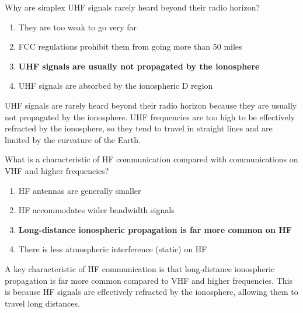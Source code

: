 \begin{tcolorbox}[colback=gray!10!white,colframe=black!75!black,title={T3C01}]
    Why are simplex UHF signals rarely heard beyond their radio horizon?
    \begin{enumerate}[label=\Alph*),noitemsep]
        \item They are too weak to go very far
        \item FCC regulations prohibit them from going more than 50 miles
        \item \textbf{UHF signals are usually not propagated by the ionosphere}
        \item UHF signals are absorbed by the ionospheric D region
    \end{enumerate}
\end{tcolorbox}
UHF signals are rarely heard beyond their radio horizon because they are usually not propagated by the ionosphere. UHF frequencies are too high to be effectively refracted by the ionosphere, so they tend to travel in straight lines and are limited by the curvature of the Earth.

\begin{tcolorbox}[colback=gray!10!white,colframe=black!75!black,title={T3C02}]
    What is a characteristic of HF communication compared with communications on VHF and higher frequencies?
    \begin{enumerate}[label=\Alph*),noitemsep]
        \item HF antennas are generally smaller
        \item HF accommodates wider bandwidth signals
        \item \textbf{Long-distance ionospheric propagation is far more common on HF}
        \item There is less atmospheric interference (static) on HF
    \end{enumerate}
\end{tcolorbox}
A key characteristic of HF communication is that long-distance ionospheric propagation is far more common compared to VHF and higher frequencies. This is because HF signals are effectively refracted by the ionosphere, allowing them to travel long distances.

